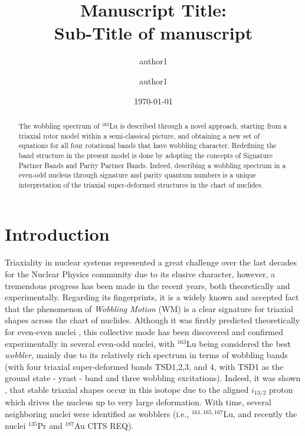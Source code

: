 \documentclass[%
 reprint,
 amsmath,
 amssymb,
 aps,
]{revtex4-2}
\begin{document}
\title{Manuscript Title:\\Sub-Title of manuscript }%

\author{author1}%
\author{author1}%
%


\date{\today}

\begin{abstract}
The wobbling spectrum of $^{163}$Lu is described through a novel approach, starting from a triaxial rotor model within a semi-classical picture, and obtaining a new set of equations for all four rotational bands that have wobbling character. Redefining the band structure in the present model is done by adopting the concepts of Signature Partner Bands and Parity Partner Bands. Indeed, describing a wobbling spectrum in a even-odd nucleus through signature and parity quantum numbers is a unique interpretation of the triaxial super-deformed structures in the chart of nuclides.
\end{abstract}

\maketitle


\section{Introduction}

Triaxiality in nuclear systems represented a great challenge over the last decades for the Nuclear Physics community due to its elusive character, however, a tremendous progress has been made in the recent years, both theoretically and experimentally. Regarding its fingerprints, it is a widely known and accepted fact that the phenomenon of \emph{Wobbling Motion} (WM) is a clear signature for triaxial shapes across the chart of nuclides. Although it was firstly predicted theoretically for even-even nuclei \cite{bohr1998nuclear}, this collective mode has been discovered and confirmed experimentally in several even-odd nuclei, with $^{163}$Lu being considered the best \emph{wobbler}, mainly due to its relatively rich spectrum in terms of wobbling bands (with four triaxial super-deformed bands TSD1,2,3, and 4, with TSD1 as the ground state - yrast - band and three wobbling excitations). Indeed, it was shown \cite{odegaard2001evidence}, \cite{jensen2002wobbling} that stable triaxial shapes occur in this isotope due to the aligned $i_{13/2}$ proton which drives the nucleus up to very large deformation. With time, several neighboring nuclei were identified as wobblers (i.e., $^{161,165,167}$Lu, and recently the nuclei $^{135}$Pr and $^{187}$Au {\color{red}CITS REQ}).
\end{document}
